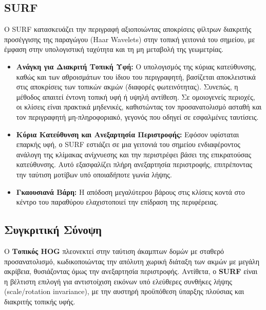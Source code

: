 \documentclass[12pt,a4paper]{article}
\begin{document}
\subsection*{\foreignlanguage{english}{SURF}}
\hspace{0.6cm}Ο \foreignlanguage{english}{SURF} κατασκευάζει την περιγραφή αξιοποιώντας αποκρίσεις φίλτρων διακριτής προσέγγισης της παραγώγου (\foreignlanguage{english}{Haar Wavelets}) στην τοπική γειτονιά του σημείου, με έμφαση στην υπολογιστική ταχύτητα και τη μη μεταβολή της γεωμετρίας.

\begin{itemize}
    \item \textbf{Ανάγκη για Διακριτή Τοπική Υφή:} Ο υπολογισμός της κύριας κατεύθυνσης, καθώς και των αθροισμάτων του ίδιου του περιγραφητή, βασίζεται αποκλειστικά στις αποκρίσεις των τοπικών ακμών (διαφορές φωτεινότητας). Συνεπώς, η μέθοδος απαιτεί έντονη τοπική υφή ή υψηλή αντίθεση. Σε ομοιογενείς περιοχές, οι κλίσεις είναι πρακτικά μηδενικές, καθιστώντας τον προσανατολισμό ασταθή και τον περιγραφητή μη-πληροφοριακό, γεγονός που οδηγεί σε εσφαλμένες ταυτίσεις.
    \item \textbf{Κύρια Κατεύθυνση και Ανεξαρτησία Περιστροφής:} Εφόσον υφίσταται επαρκής υφή, ο \foreignlanguage{english}{SURF} εστιάζει σε μια γειτονιά του σημείου ενδιαφέροντος ανάλογη της κλίμακας ανίχνυεσης και την περιστρέφει βάσει της επικρατούσας κατεύθυνσης. Αυτό εξασφαλίζει πλήρη ανεξαρτησία περιστροφής, επιτρέποντας την ταύτιση μοτίβων υπό οποιαδήποτε γωνία λήψης.
    \item \textbf{Γκαουσιανά Βάρη:} Η απόδοση μεγαλύτερου βάρους στις κλίσεις κοντά στο κέντρο του παραθύρου ελαχιστοποιεί την επίδραση της περιφέρειας.
\end{itemize}

\subsection*{Συγκριτική Σύνοψη}
\hspace{0.6cm}Ο \textbf{Τοπικός \foreignlanguage{english}{HOG}} πλεονεκτεί στην ταύτιση άκαμπτων δομών με σταθερό προσανατολισμό, κωδικοποιώντας την απόλυτη χωρική διάταξη των ακμών με μεγάλη ακρίβεια, θυσιάζοντας όμως την ανεξαρτησία περιστροφής. Αντίθετα, ο \textbf{\foreignlanguage{english}{SURF}} είναι η βέλτιστη επιλογή για αντιστοίχιση εικόνων υπό ελεύθερες συνθήκες λήψης (\foreignlanguage{english}{scale/rotation invariance}), με την αυστηρή προϋπόθεση ύπαρξης πλούσιας και διακριτής τοπικής υφής.
\end{document}

